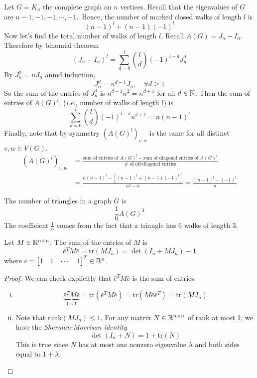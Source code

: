 \begin{example}
Let \(G=K_n\) the complete graph on \(n\) vertices.
Recall that the eigenvalues of \(G\) are \(n-1,-1,-1,\cdots,-1\).\
Hence, the number of marked closed walks of length \(l\) is
\[ (n-1)^{l}+(n-1)(-1)^l \]
Now let's find the total number of walks of length \(l\).
Recall \(A(G)=J_n-I_n\).
Therefore by binomial theorem
\[ (J_n-I_n)^l=\sum_{d=0}^{l}\binom{l}{d}(-1)^{l-d}J_n^d \]
By \(J_n^2=nJ_n\) anmd induction,
\[ J_n^d=n^{d-1}J_n, \quad \forall d\geq1 \]
So the sum of the entries of \(J_n^d\) is \(n^{d-1}n^2=n^{d+1}\) for all \(d\in\mathbb{N}\).
Then the sum of entries of \(A(G)^l\), (\textit{i.e.}, number of walks of length \(l\)) is
\[ \sum_{d=0}^l\binom{l}{d} (-1)^{l-d}{n}^{d+1}=n(n-1)^l \]
Finally, note that by symmetry \(\left(A(G)^l\right)_{v,w}\) is the same for all distinct \(v,w\in V(G)\).
\begin{align*}
\left(A(G)^l\right)_{v,w}&=\frac{\text{sum of entries of }A(G)^l-\text{sum of diagonal entries of }A(G)^l}{\# \text{ of off-diagonal entries}}\\
&=\frac{n(n-1)^l-\left[(n-1)^l+(n-1)(-1)^l\right]}{n^2-n}
=\frac{(n-1)^l-(-1)^l}{n}
\end{align*}
\end{example}

\begin{corollary}
The number of triangles in a graph \(G\) is
\[ \frac{1}{6}A(G)^3 \]
The coefficient \(\frac{1}{6}\) comes from the fact that a triangle has 6 walks of length 3.
\end{corollary}

\begin{lemma}
Let \(M\in\mathbb{R}^{n\times n}\). The sum of the entries of \(M\) is
\[ \bar{e}^T M \bar{e}=\mathrm{tr}(MJ_n)=\det(I_n+MJ_n)-1 \]
where \(\bar e=\begin{bmatrix} 1 & 1 & \cdots & 1 \end{bmatrix}^T\in\mathbb{R}^n \).
\end{lemma}
\begin{proof}
We can check explicitly that \(\bar{e}^TM\bar{e}\) is the sum of entries.
\begin{enumerate}[(i)]
\item \[ \underbrace{\bar{e}^TM\bar{e}}_{1\times1}=\mathrm{tr}\left(\bar{e}^TM\bar{e} \right)=\mathrm{tr}\left(M\bar{e}\bar{e}^T \right)=\mathrm{tr}(MJ_n) \]
\item Note that \(\mathrm{rank}(MJ_n)\leq1\).
For any matrix \(N\in\mathbb{R}^{n\times n}\) of rank at most 1, we have the \emph{Sherman-Morrison identity}
\[ \det(I_n+N)=1+\mathrm{tr}(N) \]
This is true since \(N\) has at most one nonzero eigenvalue \(\lambda\) and both sides equal to \(1+\lambda\).
\end{enumerate}
\end{proof}

